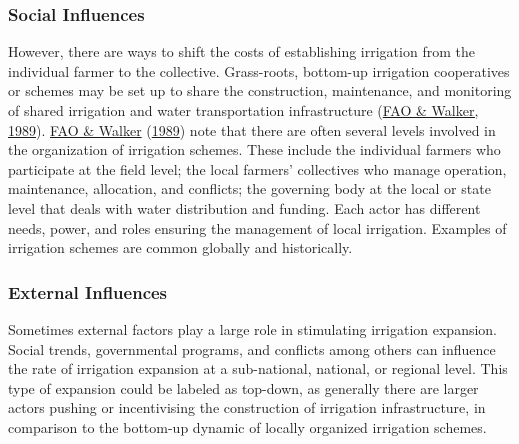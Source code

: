 \documentclass[12pt,twoside]{reedthesis}
\begin{document}
\hypertarget{socinf}{%
\subsubsection{Social Influences}\label{socinf}}

However, there are ways to shift the costs of establishing irrigation from the individual farmer to the collective. Grass-roots, bottom-up irrigation cooperatives or schemes may be set up to share the construction, maintenance, and monitoring of shared irrigation and water transportation infrastructure (\protect\hyperlink{ref-faoGuidelinesDesigningEvaluating1989}{FAO \& Walker, 1989}). \protect\hyperlink{ref-faoGuidelinesDesigningEvaluating1989}{FAO \& Walker} (\protect\hyperlink{ref-faoGuidelinesDesigningEvaluating1989}{1989}) note that there are often several levels involved in the organization of irrigation schemes. These include the individual farmers who participate at the field level; the local farmers' collectives who manage operation, maintenance, allocation, and conflicts; the governing body at the local or state level that deals with water distribution and funding. Each actor has different needs, power, and roles ensuring the management of local irrigation. Examples of irrigation schemes are common globally and historically.

\hypertarget{extinf}{%
\subsubsection{External Influences}\label{extinf}}

Sometimes external factors play a large role in stimulating irrigation expansion. Social trends, governmental programs, and conflicts among others can influence the rate of irrigation expansion at a sub-national, national, or regional level. This type of expansion could be labeled as top-down, as generally there are larger actors pushing or incentivising the construction of irrigation infrastructure, in comparison to the bottom-up dynamic of locally organized irrigation schemes.
\end{document}
